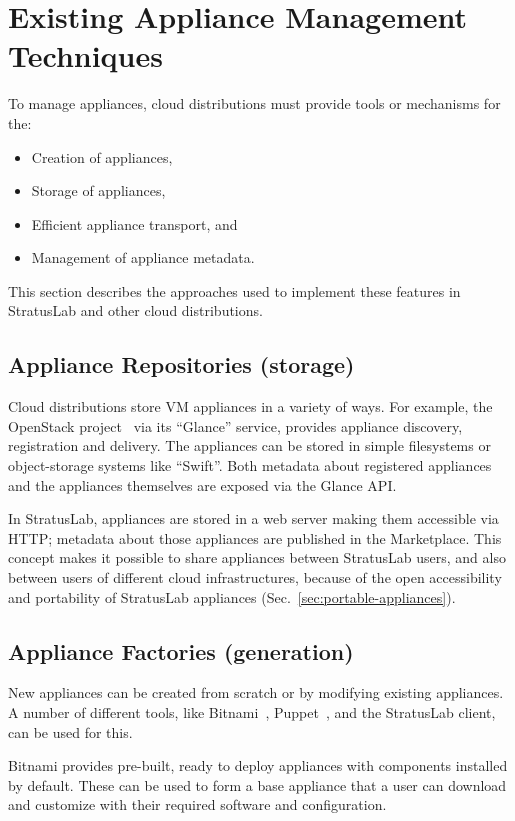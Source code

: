 \section{Existing Appliance Management Techniques}
\label{sec:other-approaches}

To manage appliances, cloud distributions must provide tools or
mechanisms for the:
\begin{itemize}
\item Creation of appliances,
\item Storage of appliances,
\item Efficient appliance transport, and
\item Management of appliance metadata.
\end{itemize}
This section describes the approaches used to implement these features
in StratusLab and other cloud distributions.

\subsection{Appliance Repositories (storage)}

Cloud distributions store VM appliances in a variety of ways. 
For example, the OpenStack project~\cite{openstack} 
via its ``Glance'' service, provides appliance discovery, registration and delivery.
The appliances can be stored in simple filesystems or 
object-storage systems like ``Swift''\@. Both metadata about registered appliances 
and the appliances themselves are exposed via the Glance API\@.

In StratusLab, appliances are stored in a web server making them accessible via HTTP;
metadata about those appliances are published in the Marketplace\@. This concept makes it possible 
to share appliances between StratusLab users, and also between users of different cloud 
infrastructures, because of the open accessibility and portability of StratusLab appliances (Sec.~\ref{sec:portable-appliances}). 

\subsection{Appliance Factories (generation)}

New appliances can be created from scratch or by modifying existing appliances.
A number of different tools, like Bitnami~\cite{bitnami}, Puppet~\cite{puppet}, and the StratusLab client,
can be used for this.

Bitnami provides pre-built, ready to deploy appliances with components installed by default.
These can be used to form a base appliance that a user can download and customize with their 
required software and configuration.

